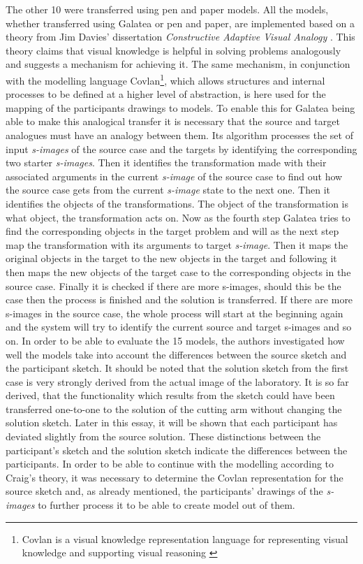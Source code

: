 \documentclass[12pt]{article}
\begin{document}
The other 10 were transferred using pen and paper models. All the models, whether transferred using Galatea or pen and paper, are implemented based on a theory from Jim Davies' dissertation \textit{Constructive Adaptive Visual Analogy} \cite{davies2004constructive}. This theory claims that visual knowledge is helpful in solving problems analogously and suggests a mechanism for achieving it. The same mechanism, in conjunction with the modelling language Covlan\footnote{Covlan is a visual knowledge representation language for representing visual knowledge and supporting visual reasoning \cite{davies2007transfer}}, which allows structures and internal processes to be defined at a higher level of abstraction, is here used for the mapping of the participants drawings to models. To enable this for Galatea being able to make this analogical transfer it is necessary that the source and target analogues must have an analogy between them. Its algorithm processes the set of input \textit{s-images} of the source case and the targets by identifying the corresponding two starter \textit{s-images}. Then it identifies the transformation made with their associated arguments in the current \textit{s-image} of the source case to find out how the source case gets from the current \textit{s-image} state to the next one. Then it identifies the objects of the transformations. The object of the transformation is what object, the transformation acts on. Now as the fourth step Galatea tries to find the corresponding objects in the target problem and will as the next step map the transformation with its arguments to target \textit{s-image}. Then it maps the original objects in the target to the new objects in the target and following it then maps the new objects of the target case to the corresponding objects in the source case. Finally it is checked if there are more s-images, should this be the case then the process is finished and the solution is transferred. If there are more s-images in the source case, the whole process will start at the beginning again and the system will try to identify the current source and target s-images and so on. In order to be able to evaluate the 15 models, the authors investigated how well the models take into account the differences between the source sketch and the participant sketch. It should be noted that the solution sketch from the first case is very strongly derived from the actual image of the laboratory. It is so far derived, that the functionality which results from the sketch could have been transferred one-to-one to the solution of the cutting arm without changing the solution sketch. Later in this essay, it will be shown that each participant has deviated slightly from the source solution. These distinctions between the participant's sketch and the solution sketch indicate the differences between the participants. In order to be able to continue with the modelling according to Craig's theory, it was necessary to determine the Covlan representation for the source sketch and, as already mentioned, the participants' drawings of the  \textit{s-images} to further process it to be able to create model out of them. 
\end{document}

